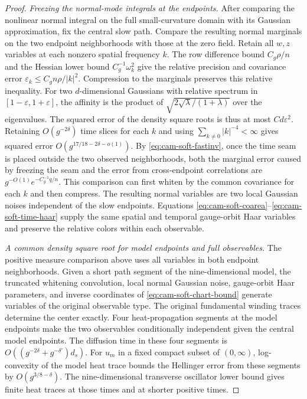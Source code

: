 \documentclass[11pt,a4paper]{article}
\numberwithin{equation}{section}
\begin{document}
\begin{proof}
\emph{Freezing the normal-mode integrals at the endpoints.}
After comparing the nonlinear normal integral on the full small-curvature domain with its Gaussian approximation, fix the central slow path. Compare the resulting normal marginals on the two endpoint neighborhoods with those at the zero field. Retain all \(w,z\) variables at each nonzero spatial frequency \(k\). The row difference bound \(C_g\rho/n\) and the Hessian lower bound \(C_g^{-1}\omega_k^2\) give the relative precision and covariance error
\(\varepsilon_k\le C_g n\rho/|k|^2\).
Compression to the marginals preserves this relative inequality. For two \(d\)-dimensional Gaussians with relative spectrum in \([1-\varepsilon,1+\varepsilon]\), the affinity is the product of \(\sqrt{2\sqrt\lambda/(1+\lambda)}\) over the eigenvalues. The squared error of the density square roots is thus at most \(C d\varepsilon^2\). Retaining \(O(g^{-2\delta})\) time slices for each \(k\) and using \(\sum_{k\ne0}|k|^{-4}<\infty\) gives squared error \(O(g^{17/18-2\delta-o(1)})\). By \eqref{eq:cam-soft-fastinv}, once the time seam is placed outside the two observed neighborhoods, both the marginal error caused by freezing the seam and the error from cross-endpoint correlations are \(g^{-O(1)}e^{-C_g^{-1}q/n}\). This comparison can first whiten by the common covariance for each \(k\) and then compress. The resulting normal variables are two local Gaussian noises independent of the slow endpoints. Equations \eqref{eq:cam-soft-coarea}--\eqref{eq:cam-soft-time-haar} supply the same spatial and temporal gauge-orbit Haar variables and preserve the relative colors within each observable.

\emph{A common density square root for model endpoints and full observables.}
The positive measure comparison above uses all variables in both endpoint neighborhoods. Given a short path segment of the nine-dimensional model, the truncated whitening convolution, local normal Gaussian noise, gauge-orbit Haar parameters, and inverse coordinates of \eqref{eq:cam-soft-chart-bound} generate variables of the original observable type. The original fundamental winding traces determine the center exactly. Four heat-propagation segments at the model endpoints make the two observables conditionally independent given the central model endpoints. The diffusion time in these four segments is \(O((g^{-2\delta}+g^{-\delta'})d_s)\). For \(u_m\) in a fixed compact subset of \((0,\infty)\), log-convexity of the model heat trace bounds the Hellinger error from these segments by \(O(g^{3/8-\delta})\). The nine-dimensional transverse oscillator lower bound gives finite heat traces at those times and at shorter positive times.


\end{proof}
\end{document}
